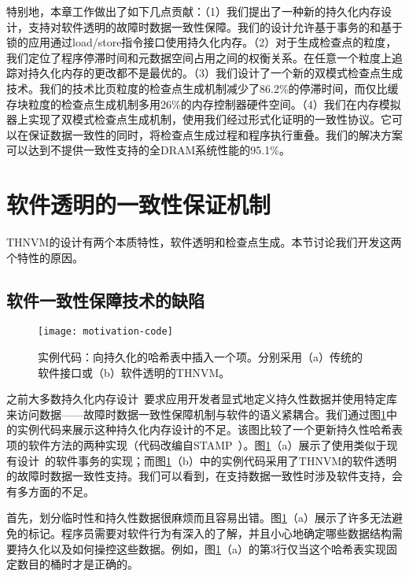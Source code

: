 特别地，本章工作做出了如下几点贡献：（1）我们提出了一种新的持久化内存设计，支持对软件透明的故障时数据一致性保障。我们的设计允许基于事务的和基于锁的应用通过load/store指令接口使用持久化内存。（2）对于生成检查点的粒度，我们定位了程序停滞时间和元数据空间占用之间的权衡关系。在任意一个粒度上追踪对持久化内存的更改都不是最优的。（3）我们设计了一个新的双模式检查点生成技术。我们的技术比页粒度的检查点生成机制减少了86.2\%的停滞时间，而仅比缓存块粒度的检查点生成机制多用26\%的内存控制器硬件空间。（4）我们在内存模拟器上实现了双模式检查点生成机制，使用我们经过形式化证明的一致性协议。它可以在保证数据一致性的同时，将检查点生成过程和程序执行重叠。我们的解决方案可以达到不提供一致性支持的全DRAM系统性能的95.1\%。

\section{软件透明的一致性保证机制}

THNVM的设计有两个本质特性，软件透明和检查点生成。本节讨论我们开发这两个特性的原因。

\subsection{软件一致性保障技术的缺陷}

\begin{figure}[!ht]
\centering \texttt{[image: motivation-code]}
  \caption{实例代码：向持久化的哈希表中插入一个项。分别采用（a）传统的软件接口或（b）软件透明的THNVM。}
\label{fig:motivation-code}
\end{figure}

之前大多数持久化内存设计~\cite{Condit:2009:BIT:1629575.1629589,Volos:2011:MLP:1950365.1950379,Coburn:2011:NMP:1950365.1950380,Zhao:2013:KCP:2540708.2540744,Venkataraman:2011:CDD:1960475.1960480}要求应用开发者显式地定义持久性数据并使用特定库来访问数据——故障时数据一致性保障机制与软件的语义紧耦合。我们通过图\ref{fig:motivation-code}中的实例代码来展示这种持久化内存设计的不足。该图比较了一个更新持久性哈希表项的软件方法的两种实现（代码改编自STAMP~\cite{Cao:2008:STA}）。图\ref{fig:motivation-code}（a）展示了使用类似于现有设计~\cite{Condit:2009:BIT:1629575.1629589, Volos:2011:MLP:1950365.1950379}的软件事务的实现；而图\ref{fig:motivation-code}（b）中的实例代码采用了THNVM的软件透明的故障时数据一致性支持。我们可以看到，在支持数据一致性时涉及软件支持，会有多方面的不足。

首先，划分临时性和持久性数据很麻烦而且容易出错。图\ref{fig:motivation-code}（a）展示了许多无法避免的标记。程序员需要对软件行为有深入的了解，并且小心地确定哪些数据结构需要持久化以及如何操控这些数据。例如，图\ref{fig:motivation-code}（a）的第3行仅当这个哈希表实现固定数目的桶时才是正确的。

